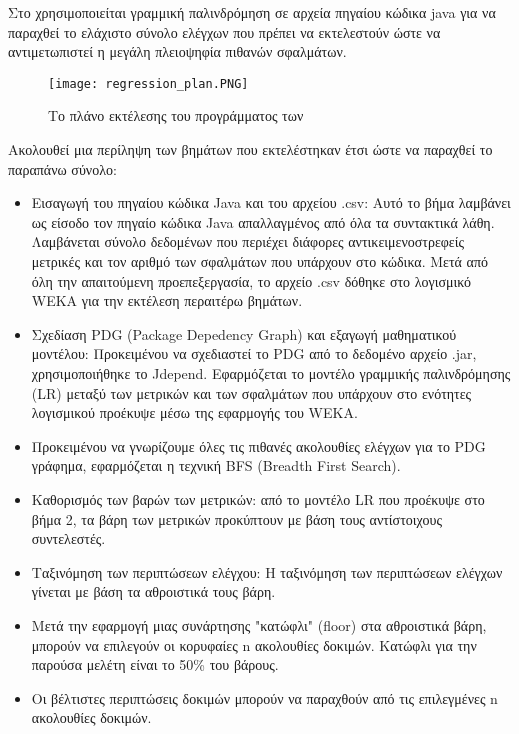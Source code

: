 \documentclass[12pt]{article}
\begin{document}
\par Στο \textcite{divya} χρησιμοποιείται γραμμική παλινδρόμηση σε αρχεία πηγαίου κώδικα java για να παραχθεί το ελάχιστο σύνολο ελέγχων που πρέπει να εκτελεστούν ώστε να αντιμετωπιστεί η μεγάλη πλειοψηφία πιθανών σφαλμάτων.

\begin{figure}
\label{fig:regression}
\caption{Το πλάνο εκτέλεσης του προγράμματος των \textcite{divya}}
\texttt{[image: regression\_plan.PNG]}
\end{figure}

\par Ακολουθεί μια περίληψη των βημάτων που εκτελέστηκαν έτσι ώστε να παραχθεί το παραπάνω σύνολο:

\begin{itemize}
\item Εισαγωγή του πηγαίου κώδικα Java και του αρχείου .csv: Αυτό το βήμα λαμβάνει ως είσοδο τον πηγαίο κώδικα Java απαλλαγμένος από όλα τα συντακτικά λάθη. Λαμβάνεται σύνολο δεδομένων που περιέχει διάφορες αντικειμενοστρεφείς μετρικές και τον αριθμό των σφαλμάτων που υπάρχουν στο κώδικα. Μετά από όλη την απαιτούμενη προεπεξεργασία, το αρχείο .csv δόθηκε στο λογισμικό WEKA για την εκτέλεση περαιτέρω βημάτων.

\item Σχεδίαση PDG (Package Depedency Graph) και εξαγωγή μαθηματικού μοντέλου: Προκειμένου να σχεδιαστεί το PDG από το δεδομένο αρχείο .jar, χρησιμοποιήθηκε το Jdepend. Εφαρμόζεται το μοντέλο γραμμικής παλινδρόμησης (LR) μεταξύ των μετρικών και των σφαλμάτων που υπάρχουν στο ενότητες λογισμικού προέκυψε μέσω της εφαρμογής του WEKA.

\item Προκειμένου να γνωρίζουμε όλες τις πιθανές ακολουθίες ελέγχων για το PDG γράφημα, εφαρμόζεται η τεχνική BFS (Breadth First Search).

\item Καθορισμός των βαρών των μετρικών: από το μοντέλο LR που προέκυψε στο βήμα 2, τα βάρη των μετρικών προκύπτουν με βάση τους αντίστοιχους συντελεστές.

\item Ταξινόμηση των περιπτώσεων ελέγχου: Η ταξινόμηση των περιπτώσεων ελέγχων γίνεται με βάση τα αθροιστικά τους βάρη. 

\item Μετά την εφαρμογή μιας συνάρτησης "κατώφλι" (floor) στα αθροιστικά βάρη, μπορούν να επιλεγούν οι κορυφαίες n ακολουθίες δοκιμών. Κατώφλι για την παρούσα μελέτη είναι το 50\% του βάρους.

\item Οι βέλτιστες περιπτώσεις δοκιμών μπορούν να παραχθούν από τις επιλεγμένες n ακολουθίες δοκιμών.

\end{itemize}
 
\end{document}
